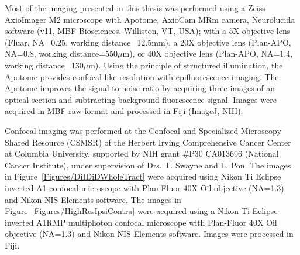 Most of the imaging presented in this thesis was performed using a Zeiss AxioImager M2 microscope with Apotome, AxioCam MRm camera, Neurolucida software (v11, MBF Biosciences, Williston, VT, USA); with a 5X objective lens (Fluar, NA=0.25, working distance=12.5mm), a 20X objective lens (Plan-APO, NA=0.8, working distance=550$\mu$m), or 40X objective lens (Plan-APO, NA=1.4, working distance=130$\mu$m).
Using the principle of structured illumination, the Apotome provides confocal-like resolution with epifluorescence imaging.
The Apotome improves the signal to noise ratio by acquiring three images of an optical section and subtracting background fluorescence signal.
Images were acquired in MBF raw format and processed in Fiji (ImageJ, NIH).

Confocal imaging was performed at the Confocal and Specialized Microscopy Shared Resource (CSMSR) of the Herbert Irving Comprehensive Cancer Center at Columbia University, supported by NIH grant \#P30 CA013696 (National Cancer Institute), under supervision of Drs. T. Swayne and L. Pon.
The images in Figure~\ref{Figures/DiIDiDWholeTract} were acquired using Nikon Ti Eclipse inverted A1 confocal microscope with Plan-Fluor 40X Oil objective (NA=1.3) and Nikon NIS Elements software.
The images in Figure~\ref{Figures/HighResIpsiContra} were acquired using a Nikon Ti Eclipse inverted A1RMP multiphoton confocal microscope with Plan-Fluor 40X Oil objective (NA=1.3) and Nikon NIS Elements software.
Images were processed in Fiji.
